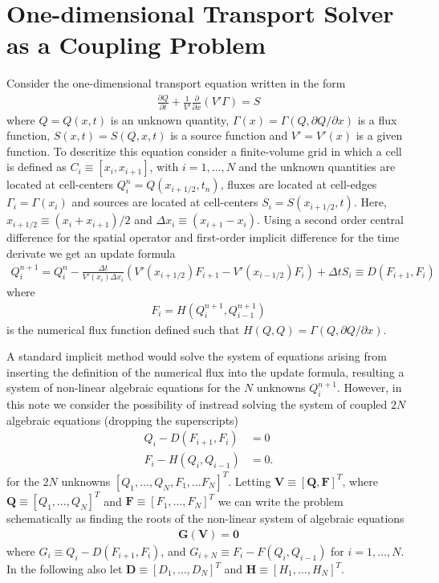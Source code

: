 \documentclass[11pt]{article}
\newcommand{\pfrac}[2]{\frac{\partial #1}{\partial #2}}
\newcommand{\pfraca}[1]{\frac{\partial}{\partial #1}}
\newcommand{\pfracb}[2]{\partial #1/\partial #2}
\newcommand{\mvec}[1]{\mathbf{#1}}
\newcommand{\gvec}[1]{\boldsymbol{#1}}
\begin{document}
\section{One-dimensional Transport Solver as a Coupling Problem}

Consider the one-dimensional transport equation written in the form
\begin{align}
  \pfrac{Q}{t} + \frac{1}{V'} \pfraca{x} \left( V' \Gamma \right) = S
\end{align}
where $Q = Q(x,t)$ is an unknown quantity, $\Gamma(x) =
\Gamma(Q,\pfracb{Q}{x})$ is a flux function, $S(x,t) = S(Q,x,t)$ is a
source function and $V' = V'(x)$ is a given function. To descritize
this equation consider a finite-volume grid in which a cell is defined
as $C_i \equiv [x_i, x_{i+1}]$, with $i=1,\ldots,N$ and the unknown
quantities are located at cell-centers $Q_i^n = Q(x_{i+1/2},t_n)$,
fluxes are located at cell-edges $\Gamma_i = \Gamma(x_i)$ and sources
are located at cell-centers $S_i = S(x_{i+1/2},t)$. Here, $x_{i+1/2}
\equiv (x_i+x_{i+1})/2$ and $\Delta x_i \equiv (x_{i+1}-x_i)$. Using a
second order central difference for the spatial operator and
first-order implicit difference for the time derivate we get an update
formula
\begin{align}
  Q_i^{n+1} = Q^n_i - \frac{\Delta t}{V'(x_i) \Delta x_i}
  \left (
    V'(x_{i+1/2}) F_{i+1} - V'(x_{i-1/2}) F_i
  \right)
  +
  \Delta t S_i \equiv D(F_{i+1}, F_{i}) \label{eqn:update-form}
\end{align}
where
\begin{align}
  F_i = H(Q_i^{n+1}, Q_{i-1}^{n+1}) \label{eqn:flux-func}
\end{align}
is the numerical flux function defined such that $H(Q,Q) =
\Gamma(Q,\pfracb{Q}{x})$.

A standard implicit method would solve the system of equations arising
from inserting the definition of the numerical flux into the update
formula, resulting a system of non-linear algebraic equations for the
$N$ unknowns $Q_i^{n+1}$. However, in this note we consider the
possibility of instread solving the system of coupled $2N$ algebraic
equations (dropping the superscripts)
\begin{align}
  Q_i - D(F_{i+1}, F_i) &= 0  \label{eqn:q-eqn} \\
  F_i - H(Q_i, Q_{i-1}) &= 0. \label{eqn:f-eqn}
\end{align}
for the $2N$ unknowns $[Q_1, \ldots, Q_N, F_1, \ldots F_N
]^T$. Letting $\mvec{V} \equiv [\mvec{Q}, \mvec{F}]^T$, where
$\mvec{Q} \equiv [Q_1, \ldots, Q_N]^T$ and $\mvec{F} \equiv [F_1,
\ldots, F_N]^T$ we can write the problem schematically as finding the
roots of the non-linear system of algebraic equations
\begin{align}
  \mvec{G}(\mvec{V}) = \mvec{0} \label{eqn:g-eqn}
\end{align}
where $G_i \equiv Q_i - D(F_{i+1}, F_i)$, and $G_{i+N} \equiv F_i -
F(Q_i, Q_{i-1})$ for $i=1,\ldots,N$. In the following also let
$\mvec{D} \equiv [D_1,\ldots,D_N]^T$ and $\gvec{H} \equiv
[H_1,\ldots,H_N]^T$.
\end{document}
